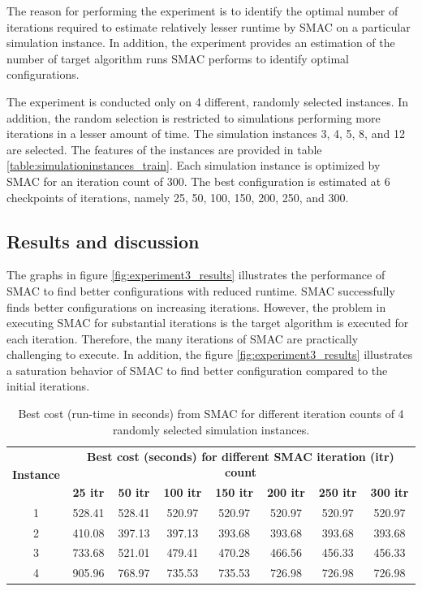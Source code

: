 The reason for performing the experiment is to identify the optimal number of iterations required to estimate relatively lesser runtime by SMAC on a particular simulation instance. In addition, the experiment provides an estimation of the number of target algorithm runs SMAC performs to identify optimal configurations.

The experiment is conducted only on 4 different, randomly selected instances. In addition, the random selection is restricted to simulations performing more iterations in a lesser amount of time. The simulation instances 3, 4, 5, 8, and 12 are selected. The features of the instances are provided in table \ref{table:simulationinstances_train}. Each simulation instance is optimized by SMAC for an iteration count of 300. The best configuration is estimated at 6 checkpoints of iterations, namely 25, 50, 100, 150, 200, 250, and 300.

\subsection{Results and discussion}

The graphs in figure \ref{fig:experiment3_results} illustrates the performance of SMAC to find better configurations with reduced runtime. SMAC successfully finds better configurations on increasing iterations. However, the problem in executing SMAC for substantial iterations is the target algorithm is executed for each iteration. Therefore, the many iterations of SMAC are practically challenging to execute. In addition, the figure \ref{fig:experiment3_results} illustrates a saturation behavior of SMAC to find better configuration compared to the initial iterations.

\begin{table}[!h]
\centering
\begin{tabular}{|c|c|c|c|c|c|c|c|}
\hline
\multirow{2}{*}{\textbf{Instance}} & \multicolumn{7}{c|}{\textbf{Best cost (seconds) for different SMAC iteration (itr) count}} \\ \cline{2-8} 
 & \textbf{25 itr} & \textbf{50 itr} & \textbf{100 itr} & \textbf{150 itr} & \textbf{200 itr} & \textbf{250 itr} & \textbf{300 itr} \\ \hline
1 & 528.41 & 528.41 & 520.97 & 520.97 & 520.97 & 520.97 & 520.97 \\ \hline
2 & 410.08 & 397.13 & 397.13 & 393.68 & 393.68 & 393.68 & 393.68 \\ \hline
3 & 733.68 & 521.01 & 479.41 & 470.28 & 466.56 & 456.33 & 456.33 \\ \hline
4 & 905.96 & 768.97 & 735.53 & 735.53 & 726.98 & 726.98 & 726.98 \\ \hline
\end{tabular}
\captionsetup{justification=justified}
\caption[Performance of SMAC best configuration versus iteration count]{Best cost (run-time in seconds) from SMAC for different iteration counts of 4 randomly selected simulation instances.}
\label{table:experiment3_results}
\end{table}

